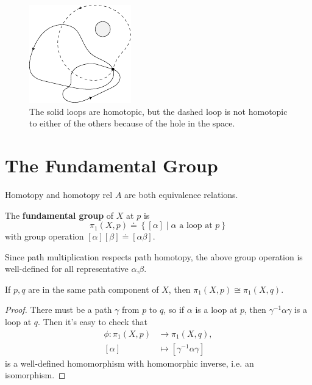 \documentclass[twoside,10pt]{report}
\begin{document}
\begin{figure}[H]
	\centering
	\includegraphics[scale=1.5]{fig/homotopic.pdf}
	\caption{The solid loops are homotopic, but the dashed loop is not homotopic to either of the others because of the hole in the space.}
\end{figure}



\section{The Fundamental Group}

\begin{lem}
Homotopy and homotopy rel $A$ are both equivalence relations.
\end{lem}

\begin{defn}[]
	The \textbf{fundamental group} of $X$ at $p$ is
	\[
		\pi_1(X,p) \doteq \left\{ [\alpha] \;|\; \alpha \text{ a loop at } p \right\}
	\] 
	with group operation
	$
		[\alpha][\beta] \doteq [\alpha \beta].
	$ 
\end{defn}

Since path multiplication respects path homotopy, the above group operation is well-defined for all representative $\alpha$,$\beta$.

\begin{prop}
	If $p,q$ are in the same path component of $X$, then $\pi_1(X,p) \cong \pi_1(X,q)$.
\end{prop}
\begin{proof}
	There must be a path $\gamma$ from $p$ to $q$, so if $\alpha$ is a loop at $p$, then $\gamma^{-1}\alpha\gamma$ is a loop at $q$. Then it's easy to check that
	\begin{align*}
		\phi:\pi_1(X,p)&\to \pi_1(X,q),\\
		[\alpha]&\mapsto [\gamma^{-1}\alpha\gamma]
	\end{align*}
	is a well-defined homomorphism with homomorphic inverse, i.e. an isomorphism.
\end{proof}
\end{document}
